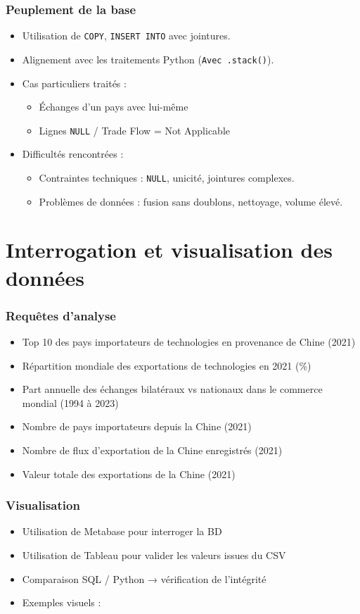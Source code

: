 \documentclass[11pt]{beamer}
\begin{document}
\begin{frame}
  \frametitle{Peuplement de la base}
  \begin{itemize}
    \item<1-> Utilisation de \texttt{COPY}, \texttt{INSERT INTO} avec jointures.
    \item<1-> Alignement avec les traitements Python (\texttt{Avec .stack()}).
    \item<1-> Cas particuliers traités : 
      \begin{itemize}
        \item Échanges d’un pays avec lui-même
        \item Lignes \texttt{NULL} / Trade Flow = Not Applicable
      \end{itemize}
    \item<2-> Difficultés rencontrées :
    	\begin{itemize}
  			\item Contraintes techniques : \texttt{NULL}, unicité, jointures complexes.
  			\item Problèmes de données : fusion sans doublons, nettoyage, volume élevé.
		\end{itemize}
    \end{itemize}
\end{frame}

\section{Interrogation et visualisation des données}
\begin{frame}
  \frametitle{Requêtes d’analyse}
  \begin{itemize}
    \item Top 10 des pays importateurs de technologies en provenance de Chine (2021)
    \item Répartition mondiale des exportations de technologies en 2021 (\%)
    \item Part annuelle des échanges bilatéraux vs nationaux dans le commerce mondial (1994 à 2023)
    \item Nombre de pays importateurs depuis la Chine (2021)
    \item Nombre de flux d’exportation de la Chine enregistrés (2021)
    \item Valeur totale des exportations de la Chine (2021)
  \end{itemize}
\end{frame}

\begin{frame}
  \frametitle{Visualisation}
  \begin{itemize}
    \item Utilisation de Metabase pour interroger la BD
    \item Utilisation de Tableau pour valider les valeurs issues du CSV
    \item Comparaison SQL / Python → vérification de l’intégrité
    \item Exemples visuels :
  \end{itemize}
\end{frame}
\end{document}
